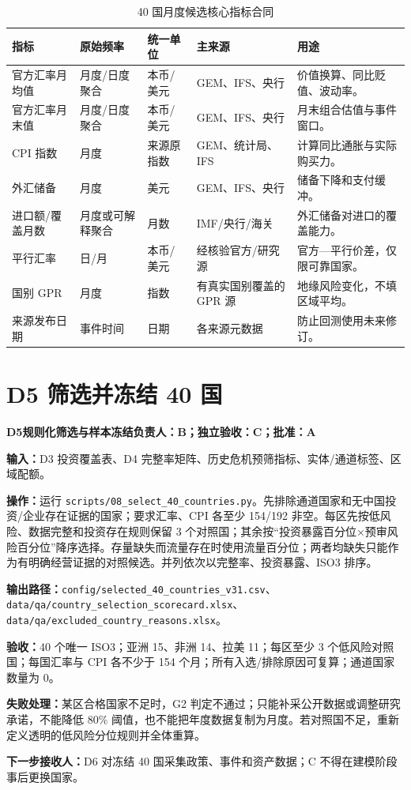 \documentclass[UTF8,fontset=windows,12pt,openany]{ctexbook}
\newcommand{\File}[1]{{\small\nolinkurl{#1}}}
\newcommand{\StepTitle}[3]{%
  \noindent\colorbox{DeepNavy}{\parbox{0.965\textwidth}{\color{white}\Large\bfseries #1\quad #2\hfill\normalsize #3}}\par\medskip
}
\newcommand{\CardRow}[2]{\noindent\textbf{#1：}#2\par}
\begin{document}
\begin{longtable}{p{3.2cm}p{2.6cm}p{2.5cm}p{2.4cm}p{3.1cm}}
\caption{40 国月度候选核心指标合同}\label{tab:monthly-core}\\
\toprule
\textbf{指标} & \textbf{原始频率} & \textbf{统一单位} & \textbf{主来源} & \textbf{用途}\\
\midrule
官方汇率月均值 & 月度/日度聚合 & 本币/美元 & GEM、IFS、央行 & 价值换算、同比贬值、波动率。\\
官方汇率月末值 & 月度/日度聚合 & 本币/美元 & GEM、IFS、央行 & 月末组合估值与事件窗口。\\
CPI 指数 & 月度 & 来源原指数 & GEM、统计局、IFS & 计算同比通胀与实际购买力。\\
外汇储备 & 月度 & 美元 & GEM、IFS、央行 & 储备下降和支付缓冲。\\
进口额/覆盖月数 & 月度或可解释聚合 & 月数 & IMF/央行/海关 & 外汇储备对进口的覆盖能力。\\
平行汇率 & 日/月 & 本币/美元 & 经核验官方/研究源 & 官方—平行价差，仅限可靠国家。\\
国别 GPR & 月度 & 指数 & 有真实国别覆盖的 GPR 源 & 地缘风险变化，不填区域平均。\\
来源发布日期 & 事件时间 & 日期 & 各来源元数据 & 防止回测使用未来修订。\\
\bottomrule
\end{longtable}

\newpage
\section{D5 筛选并冻结 40 国}
\StepTitle{D5}{规则化筛选与样本冻结}{负责人：B；独立验收：C；批准：A}
\CardRow{输入}{D3 投资覆盖表、D4 完整率矩阵、历史危机预筛指标、实体/通道标签、区域配额。}
\CardRow{操作}{运行 \File{scripts/08_select_40_countries.py}。先排除通道国家和无中国投资/企业存在证据的国家；要求汇率、CPI 各至少 154/192 非空。每区先按低风险、数据完整和投资存在规则保留 3 个对照国；其余按“投资暴露百分位×预审风险百分位”降序选择。存量缺失而流量存在时使用流量百分位；两者均缺失只能作为有明确经营证据的对照候选。并列依次以完整率、投资暴露、ISO3 排序。}
\CardRow{输出路径}{\File{config/selected_40_countries_v31.csv}、\File{data/qa/country_selection_scorecard.xlsx}、\File{data/qa/excluded_country_reasons.xlsx}。}
\CardRow{验收}{40 个唯一 ISO3；亚洲 15、非洲 14、拉美 11；每区至少 3 个低风险对照国；每国汇率与 CPI 各不少于 154 个月；所有入选/排除原因可复算；通道国家数量为 0。}
\CardRow{失败处理}{某区合格国家不足时，G2 判定不通过；只能补采公开数据或调整研究承诺，不能降低 80\% 阈值，也不能把年度数据复制为月度。若对照国不足，重新定义透明的低风险分位规则并全体重算。}
\CardRow{下一步接收人}{D6 对冻结 40 国采集政策、事件和资产数据；C 不得在建模阶段事后更换国家。}
\end{document}
